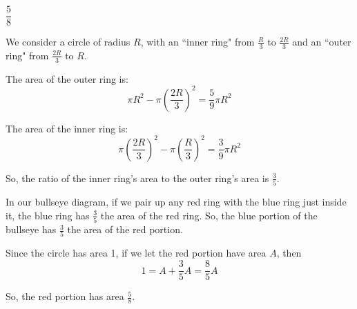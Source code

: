 \begin{answer}
$\dfrac{5}{8}$
\end{answer}
\begin{solution}
We consider a circle of radius $R$, with an ``inner ring" from $\frac{R}{3}$ to $\frac{2R}{3}$ and an ``outer ring" from $\frac{2R}{3}$ to $R$.

The area of the outer ring is:
\[\pi R^2 - \pi \left(\frac{2R}{3}\right)^2=\frac{5}{9}\pi R^2\]

The area of the inner ring is:
\[\pi \left(\frac{2R}{3}\right)^2 - \pi \left(\frac{R}{3}\right)^2=\frac{3}{9}\pi R^2\]

So, the ratio of the inner ring's area to the outer ring's area is $\frac{3}{5}$.

In our bullseye diagram,  if we pair up any red ring with the blue ring just inside it, the blue ring has $\frac{3}{5}$ the area of the red ring. So, the blue portion of the bullseye has $\frac{3}{5}$ the area of the red portion.

Since the circle has area 1, if we let the red portion have area $A$, then
\[1=A+\frac{3}{5}A=\frac{8}{5}A\]

 So, the red portion has area $\frac{5}{8}$.

\end{solution}
